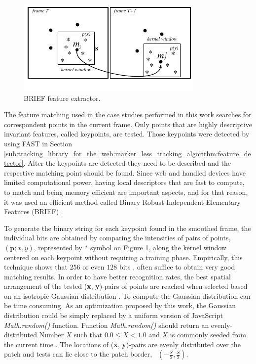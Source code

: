\begin{figure}[!htb]
  \centering
  \includegraphics[width=\linewidth]{chapters/tracking_library_for_the_web/BRIEF.pdf}
  \caption{BRIEF \cite{Lepetit2005} feature extractor.}
  \label{figure:BRIEF}
\end{figure}

The feature matching used in the case studies performed in this work searches for correspondent points in the current frame. Only points that are highly descriptive invariant features, called keypoints, are tested. Those keypoints were detected by using FAST \cite{Rosten2010} in Section \ref{sub:tracking_library_for_the_web:marker_less_tracking_algorithm:feature_detector}. After the keypoints are detected they need to be described and the respective matching point should be found. Since web and handled devices have limited computational power, having local descriptors that are fast to compute, to match and being memory efficient are important aspects, and for that reason, it was used an efficient method called Binary Robust Independent Elementary Features (BRIEF) \cite{Calonder2010}.

To generate the binary string for each keypoint found in the smoothed frame, the individual bits are obtained by comparing the intensities of pairs of points, $(\textbf{p}; x, y)$, represented by $\ast$ symbol on Figure \ref{figure:BRIEF}, along the kernel window centered on each keypoint without requiring a training phase.
Empirically, this technique shows that $256$ or even $128$ bits \cite{Calonder2010}, often suffice to obtain very good matching results. In order to have better recognition rates, the best spatial arrangement of the tested (\textbf{x}, \textbf{y})-pairs of points are reached when selected based on an isotropic Gaussian distribution \cite{Calonder2010}. To compute the Gaussian distribution can be time consuming. As an optimization proposed by this work, the Gaussian distribution could be simply replaced by a uniform version of JavaScript \textit{Math.random()} function. Function \textit{Math.random()} should return an evenly-distributed Number $X$ such that $0.0 \le X < 1.0$ and $X$ is commonly seeded from the current time \cite{International2009}. The locations of (\textbf{x}, \textbf{y})-pairs are evenly distributed over the patch and tests can lie close to the patch border, \ie\ $(-\frac{S}{2},\frac{S}{2})$.

